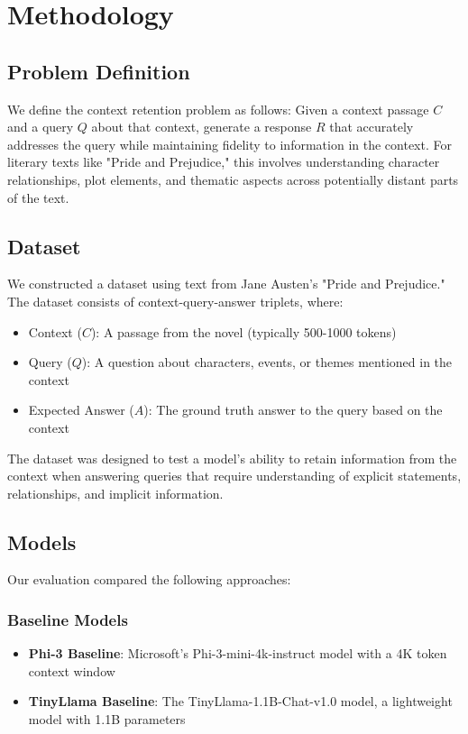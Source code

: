 \documentclass[conference]{IEEEtran}
\begin{document}
\section{Methodology}

\subsection{Problem Definition}
We define the context retention problem as follows: Given a context passage $C$ and a query $Q$ about that context, generate a response $R$ that accurately addresses the query while maintaining fidelity to information in the context. For literary texts like "Pride and Prejudice," this involves understanding character relationships, plot elements, and thematic aspects across potentially distant parts of the text.

\subsection{Dataset}
We constructed a dataset using text from Jane Austen's "Pride and Prejudice." The dataset consists of context-query-answer triplets, where:
\begin{itemize}
    \item Context ($C$): A passage from the novel (typically 500-1000 tokens)
    \item Query ($Q$): A question about characters, events, or themes mentioned in the context
    \item Expected Answer ($A$): The ground truth answer to the query based on the context
\end{itemize}

The dataset was designed to test a model's ability to retain information from the context when answering queries that require understanding of explicit statements, relationships, and implicit information.

\subsection{Models}
Our evaluation compared the following approaches:

\subsubsection{Baseline Models}
\begin{itemize}
    \item \textbf{Phi-3 Baseline}: Microsoft's Phi-3-mini-4k-instruct model with a 4K token context window
    \item \textbf{TinyLlama Baseline}: The TinyLlama-1.1B-Chat-v1.0 model, a lightweight model with 1.1B parameters
\end{itemize}
\end{document}
